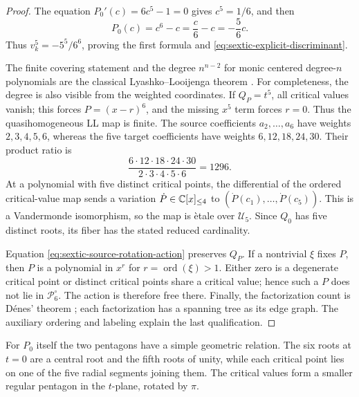 \begin{proof}
The equation $P_0'(c)=6c^5-1=0$ gives $c^5=1/6$, and then
\begin{equation}
 P_0(c)=c^6-c=\frac{c}{6}-c=-\frac56c.
 \label{eq:sextic-critical-value-computation}
\end{equation}
Thus $v_k^5=-5^5/6^6$, proving the first formula and
\eqref{eq:sextic-explicit-discriminant}.

The finite covering statement and the degree $n^{n-2}$ for monic centered
degree-$n$ polynomials are the classical Lyashko--Looijenga theorem
\cite{Looijenga1974Bifurcation,Lyashko1984Bifurcation}.  For completeness, the
degree is also visible from the weighted coordinates.  If $Q_P=t^5$, all
critical values vanish; this forces $P=(x-r)^6$, and the missing $x^5$ term
forces $r=0$.  Thus the quasihomogeneous LL map is finite.  The source coefficients
$a_2,\ldots,a_6$ have weights $2,3,4,5,6$, whereas the five target coefficients
have weights $6,12,18,24,30$.  Their product ratio is
\begin{equation}
 \frac{6\cdot12\cdot18\cdot24\cdot30}
      {2\cdot3\cdot4\cdot5\cdot6}=1296.
 \label{eq:sextic-ll-weighted-degree}
\end{equation}
At a polynomial with five distinct critical points, the differential of the
ordered critical-value map sends a variation $\dot P\in\mathbb{C}[x]_{\le4}$ to
$(\dot P(c_1),\ldots,\dot P(c_5))$.  This is a Vandermonde isomorphism, so the
map is \`etale over $\mathcal U_5$.  Since $Q_0$ has five distinct roots, its
fiber has the stated reduced cardinality.

Equation \eqref{eq:sextic-source-rotation-action} preserves $Q_P$.  If a
nontrivial $\xi$ fixes $P$, then $P$ is a polynomial in $x^r$ for
$r=\operatorname{ord}(\xi)>1$.  Either zero is a degenerate critical point or
distinct critical points share a critical value; hence such a $P$ does not lie
in $\mathcal P_6^\circ$.  The action is therefore free there.  Finally, the
factorization count is D\'enes' theorem
\cite{Denes1959TranspositionFactorizations}; each factorization has a spanning
tree as its edge graph.  The auxiliary ordering and labeling explain the last
qualification.
\end{proof}

For $P_0$ itself the two pentagons have a simple geometric relation.  The six
roots at $t=0$ are a central root and the fifth roots of unity, while each
critical point lies on one of the five radial segments joining them.  The
critical values form a smaller regular pentagon in the $t$-plane, rotated by
$\pi$.

